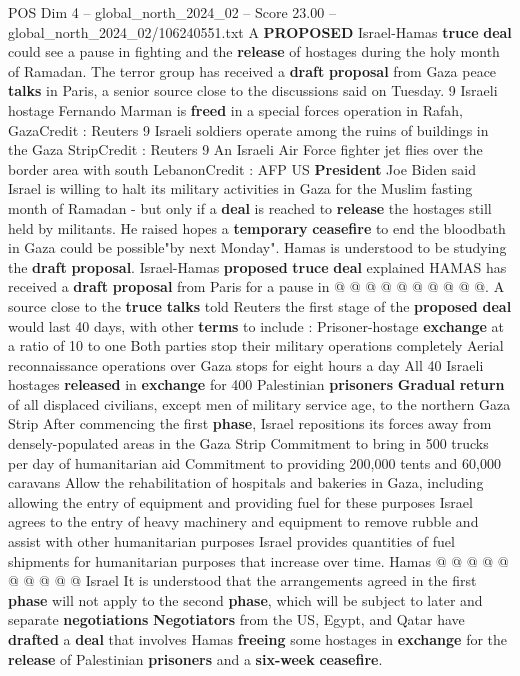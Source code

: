 \begin{textsample}{POS Dim 4 – global\_north\_2024\_02 – Score 23.00 – global\_north\_2024\_02/106240551.txt}  \label{ex:f4_pos_186}
A \textbf{PROPOSED} Israel-Hamas \textbf{truce} \textbf{deal} could see a pause in fighting and the \textbf{release} of hostages during the holy month of Ramadan.
The terror group has received a \textbf{draft} \textbf{proposal} from Gaza peace \textbf{talks} in Paris, a senior source close to the discussions said on Tuesday. 9 Israeli hostage Fernando Marman is \textbf{freed} in a special forces operation in Rafah, GazaCredit : Reuters 9 Israeli soldiers operate among the ruins of buildings in the Gaza StripCredit : Reuters 9 An Israeli Air Force fighter jet flies over the border area with south LebanonCredit : AFP US \textbf{President} Joe Biden said Israel is willing to halt its military activities in Gaza for the Muslim fasting month of Ramadan - but only if a \textbf{deal} is reached to \textbf{release} the hostages still held by militants.
He raised hopes a \textbf{temporary} \textbf{ceasefire} to end the bloodbath in Gaza could be possible"by next Monday".
Hamas is understood to be studying the \textbf{draft} \textbf{proposal}.
Israel-Hamas \textbf{proposed} \textbf{truce} \textbf{deal} explained HAMAS has received a \textbf{draft} \textbf{proposal} from Paris for a pause in @ @ @ @ @ @ @ @ @ @.
A source close to the \textbf{truce} \textbf{talks} told Reuters the first stage of the \textbf{proposed} \textbf{deal} would last 40 days, with other \textbf{terms} to include : Prisoner-hostage \textbf{exchange} at a ratio of 10 to one Both parties stop their military operations completely Aerial reconnaissance operations over Gaza stops for eight hours a day All 40 Israeli hostages \textbf{released} in \textbf{exchange} for 400 Palestinian \textbf{prisoners} \textbf{Gradual} \textbf{return} of all displaced civilians, except men of military service age, to the northern Gaza Strip After commencing the first \textbf{phase}, Israel repositions its forces away from densely-populated areas in the Gaza Strip Commitment to bring in 500 trucks per day of humanitarian aid Commitment to providing 200,000 tents and 60,000 caravans Allow the rehabilitation of hospitals and bakeries in Gaza, including allowing the entry of equipment and providing fuel for these purposes Israel agrees to the entry of heavy machinery and equipment to remove rubble and assist with other humanitarian purposes Israel provides quantities of fuel shipments for humanitarian purposes that increase over time.
Hamas @ @ @ @ @ @ @ @ @ @ Israel It is understood that the arrangements agreed in the first \textbf{phase} will not apply to the second \textbf{phase}, which will be subject to later and separate \textbf{negotiations} \textbf{Negotiators} from the US, Egypt, and Qatar have \textbf{drafted} a \textbf{deal} that involves Hamas \textbf{freeing} some hostages in \textbf{exchange} for the \textbf{release} of Palestinian \textbf{prisoners} and a \textbf{six-week} \textbf{ceasefire}.

\end{textsample}

